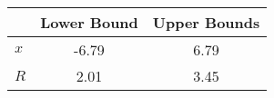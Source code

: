 \begin{tiny}\begin{tabular}{|l|c|c|}
\hline
&\textbf{Lower Bound}&\textbf{Upper Bounds}\\\hline
\textbf{$x$}&-6.79&6.79\\\hline
\textbf{$R$}&2.01&3.45\\\hline
\end{tabular}
\end{tiny}
